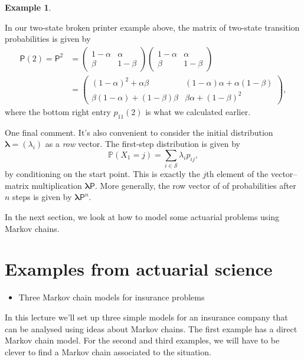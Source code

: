 \documentclass[
  a4paper,
]{article}
\providecommand{\tightlist}{%
  \setlength{\itemsep}{0pt}\setlength{\parskip}{0pt}}
\theoremstyle{definition}
\theoremstyle{definition}
\newtheorem{example}{Example}[section]
\theoremstyle{definition}
\theoremstyle{remark}
\begin{document}
\begin{example}
\protect\hypertarget{exm:printer2}{}\label{exm:printer2}

In our two-state broken printer example above, the matrix of two-state transition probabilities is given by
\begin{align*}
\mathsf P(2) = \mathsf P^2 &=  \begin{pmatrix} 1-\alpha & \alpha \\ \beta & 1-\beta \end{pmatrix}  \begin{pmatrix} 1-\alpha & \alpha \\ \beta & 1-\beta \end{pmatrix} \\
&=  \begin{pmatrix} (1-\alpha)^2 + \alpha\beta & (1-\alpha)\alpha + \alpha(1-\beta) \\ \beta(1-\alpha) + (1-\beta)\beta & \beta\alpha + (1-\beta)^2 \end{pmatrix} ,
\end{align*}
where the bottom right entry \(p_{11}(2)\) is what we calculated earlier.

\end{example}

One final comment. It's also convenient to consider the initial distribution \(\boldsymbol\lambda = (\lambda_i)\) as a \emph{row} vector. The first-step distribution is given by
\[ \mathbb P(X_1 = j) = \sum_{i \in \mathcal S} \lambda_i p_{ij} , \]
by conditioning on the start point.
This is exactly the \(j\)th element of the vector--matrix multiplication \(\boldsymbol\lambda \mathsf P\). More generally, the row vector of of probabilities after \(n\) steps is given by \(\boldsymbol\lambda \mathsf P^n\).

In the next section, we look at how to model some actuarial problems using Markov chains.

\hypertarget{S06-examples}{%
\section{Examples from actuarial science}\label{S06-examples}}

\begin{itemize}
\tightlist
\item
  Three Markov chain models for insurance problems
\end{itemize}

In this lecture we'll set up three simple models for an insurance company that can be analysed using ideas about Markov chains. The first example has a direct Markov chain model. For the second and third examples, we will have to be clever to find a Markov chain associated to the situation.
\end{document}
